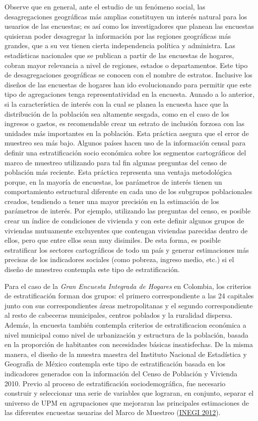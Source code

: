 \documentclass[
  12pt,
  spanish,
]{book}
\begin{document}
Observe que en general, ante el estudio de un fenómeno social, las desagregaciones geográficas más amplias constituyen un interés natural para los usuarios de las encuestas; es así como los investigadores que planean las encuestas quisieran poder desagregar la información por las regiones geográficas más grandes, que a su vez tienen cierta independencia política y administra. Las estadísticas nacionales que se publican a partir de las encuestas de hogares, cobran mayor relevancia a nivel de regiones, estados o departamentos. Este tipo de desagregaciones geográficas se conocen con el nombre de estratos. Inclusive los diseños de las encuestas de hogares han ido evolucionando para permitir que este tipo de agregaciones tenga representatividad en la encuesta. Aunado a lo anterior, si la característica de interés con la cual se planea la encuesta hace que la distribución de la población sea altamente sesgada, como en el caso de los ingresos o gastos, es recomendable crear un estrato de inclusión forzosa con las unidades más importantes en la población. Esta práctica asegura que el error de muestreo sea más bajo. Algunos países hacen uso de la información censal para definir una estratificación socio económica sobre los segmentos cartográficos del marco de muestreo utilizando para tal fin algunas preguntas del censo de población más reciente. Esta práctica representa una ventaja metodológica porque, en la mayoría de encuestas, los parámetros de interés tienen un comportamiento estructural diferente en cada uno de los subgrupos poblacionales creados, tendiendo a tener una mayor precisión en la estimación de los parámetros de interés. Por ejemplo, utilizando las preguntas del censo, es posible crear un índice de condiciones de vivienda y con este definir algunos grupos de viviendas mutuamente excluyentes que contengan viviendas parecidas dentro de ellos, pero que entre ellos sean muy disimiles. De esta forma, es posible estratificar los sectores cartográficos de todo un país y generar estimaciones más precisas de los indicadores sociales (como pobreza, ingreso medio, etc.) si el diseño de muestreo contempla este tipo de estratificación.

Para el caso de la \emph{Gran Encuesta Integrada de Hogares} en Colombia, los criterios de estratificación forman dos grupos: el primero correspondiente a las 24 capitales junto con sus correspondientes áreas metropolitanas y el segundo correspondiente al resto de cabeceras municipales, centros poblados y la ruralidad dispersa. Además, la encuesta también contempla criterios de estratificacion económica a nivel municipal como nivel de urbanización y estructura de la población, basada en la proporción de habitantes con necesidades básicas insatisfechas. De la misma manera, el diseño de la muestra maestra del Instituto Nacional de Estadística y Geografía de México contempla este tipo de estratificación basada en los indicadores generados con la información del Censo de Población y Vivienda 2010. Previo al proceso de estratificación sociodemográfica, fue necesario construir y seleccionar una serie de variables que lograran, en conjunto, separar el universo de UPM en agrupaciones que mejoraran las principales estimaciones de las diferentes encuestas usuarias del Marco de Muestreo (\protect\hyperlink{ref-INEGI_MX_2012}{INEGI 2012}).
\end{document}
